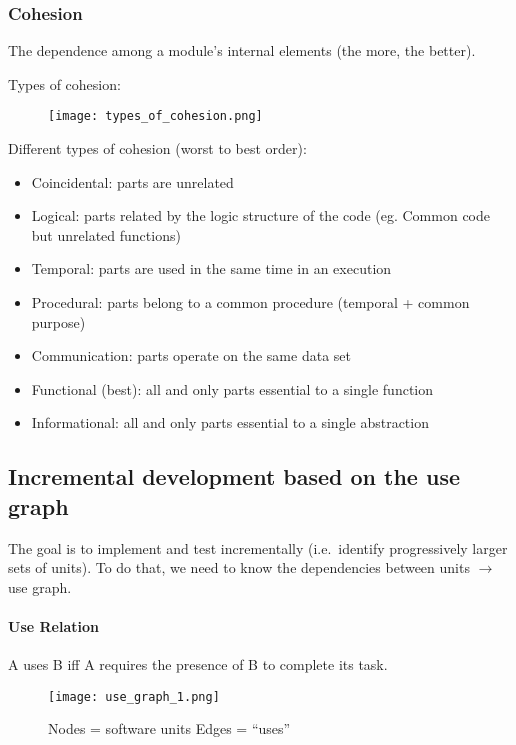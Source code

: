 \subsubsection{Cohesion}

The dependence among a module's internal elements (the more, the better). \newline

Types of cohesion:

\begin{figure}[!ht]
    \centering
    \texttt{[image: types\_of\_cohesion.png]}
\end{figure}

Different types of cohesion (worst to best order):

\begin{itemize}
\item Coincidental: parts are unrelated
\item Logical: parts related by the logic structure of the code (eg. Common code but
unrelated functions)
\item Temporal: parts are used in the same time in an execution
\item Procedural: parts belong to a common procedure (temporal + common purpose)
\item Communication: parts operate on the same data set
\item Functional (best): all and only parts essential to a single function
\item Informational: all and only parts essential to a single abstraction
\end{itemize}

\subsection{Incremental development based on the use graph}

The goal is to implement and test incrementally (i.e.\ identify progressively larger sets of
units). To do that, we need to know the dependencies between units $\rightarrow$ use graph.

\paragraph{Use Relation} A uses B iff A requires the presence of B to complete its task.

 
\begin{figure}[!ht]
    \begin{minipage}{\linewidth}
        \begin{minipage}{0.45\linewidth}
            \texttt{[image: use\_graph\_1.png]}
        \end{minipage}
        \begin{minipage}{0.45\linewidth}
            Nodes = software units \newline
            Edges = \enquote{uses}
        \end{minipage}
    \end{minipage}
\end{figure}

